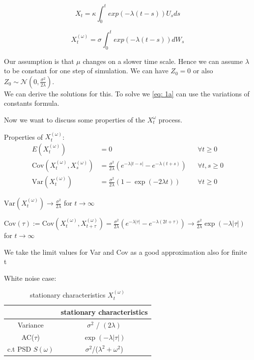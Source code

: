 \documentclass[%
thesis=student,%
coverpage=false,%
titlepage=false,%
headmarks=true, %
german,%
font=libertine, %
math=newpxtx, %
BCOR=5mm,%
coverBCOR=11mm%
]{tumbook}
\begin{document}
\begin{equation}
    X_{t} = \kappa \int_{0}^{t} exp(-\lambda(t-s))U_{s}ds
\end{equation}

\begin{equation} 
    X_{t}^{(\omega)} = \sigma\int_{0}^{t}exp(-\lambda(t-s))dW_{s}
\end{equation}

Our assumption is that $\mu$ changes on a slower time scale. Hence we can assume $\lambda$ to be constant for one step of simulation. We can have $Z_{0} = 0$ or also $Z_{0} \sim \mathcal{N}(0,\frac{\sigma^2}{2\lambda})$.\\

We can derive the solutions for this. To solve we \eqref{eq: 1a} can use the variations of constants formula.

Now we want to discuss some properties of the $X_{t}^{\omega}$ process.


Properties of $X_{t}^{(\omega)}$:
 \begin{align*}
    E(X_{t}^{(\omega)}) &= 0   && \forall t \geq 0 \\
    \text{Cov}(X_{t}^{(\omega)},X_{s}^{(\omega)}) &= \frac{\sigma ^2}{2\lambda}(e^{-\lambda\lvert t-s \rvert}-e^{-\lambda(t+s)}) && \forall t, s \geq 0 \\
    \text{Var}(X_{t}^{(\omega)}) &= \frac{\sigma^2}{2\lambda}(1-\exp(-2\lambda t)) && \forall t \geq 0 
\end{align*}

$\text{Var}(X_{t}^{(\omega)})\rightarrow\frac{\sigma^2}{2\lambda}$ for $t\rightarrow \infty$

$\text{Cov}(\tau):=\text{Cov}(X_{t}^{(\omega)},X_{t+\tau}^{(\omega)}) = \frac{\sigma^2}{2\lambda}(e^{-\lambda\lvert \tau \rvert} - e^{-\lambda(2t + \tau)}) \rightarrow \frac{\sigma ^2}{2\lambda}\exp(-\lambda\lvert \tau \rvert)$ for $t\rightarrow \infty$

We take the limit values for Var and Cov as a good approximation also for finite t

White noise case:


\begin{table}[t]
\centering
\begin{tabular}{|c|c|}
\hline
& stationary characteristics\\
\hline
Variance & $\sigma^2$ / $(2\lambda)$\\
AC($\tau$) & $\exp(-\lambda |\tau|)$\\
c.t PSD $S(\omega)$ & $\sigma^2$/($\lambda^2 + \omega^2$)\\
\hline
\end{tabular}
\caption{stationary characteristics $X_{t}^{(\omega)}$}
\label{tab:simple_table}
\end{table}
\end{document}
